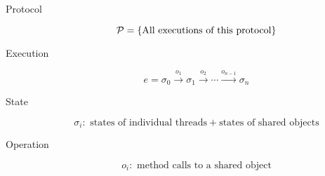 \begin{frame}{}
  \centerline{\Large {}}

  \vspace{0.60cm}
  \begin{description}
    \item[Protocol] 
      \[
	\mathcal{P} = \{\text{All executions of this protocol}\}
      \]
    \item[Execution] 
      \[
	e = \sigma_0 \xrightarrow{o_1} \sigma_1 \xrightarrow{o_2} \cdots \xrightarrow{o_{n-1}} \sigma_{n}
      \]
    \item[State] 
      \[
	\sigma_i: \text{ states of individual threads} + \text{states of shared objects}
      \]
    \item[Operation] 
      \[
	o_i: \text{ method calls to a shared object}
      \]
  \end{description}
\end{frame}


